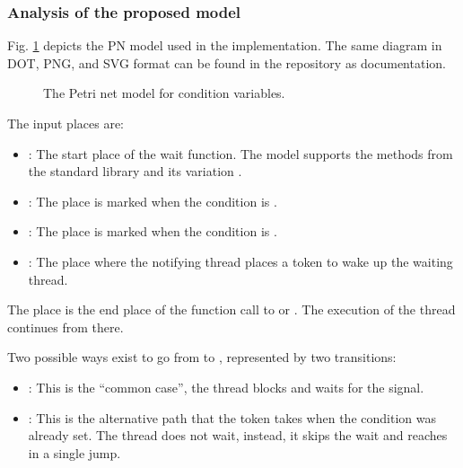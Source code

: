\subsubsection{Analysis of the proposed model}

Fig. \ref{fig:condition-variable-model} depicts
the \acrshort{PN} model used in the implementation.
The same diagram in DOT, PNG, and SVG format
can be found in the repository as documentation.

\begin{figure}[!htbp]
      \centering
      
      \caption{The Petri net model for condition variables.}
      \label{fig:condition-variable-model}
\end{figure}

The input places are:

\begin{itemize}
      \item {}: The start place of the wait function.
            The model supports the methods from the standard library 
            and its variation .
      \item {}: The place is marked when the condition is .
      \item {}: The place is marked when the condition is .
      \item {}: The place where the notifying thread places a token to wake up the waiting thread.
\end{itemize}

The  place is the end place
of the function call to  or .
The execution of the thread continues from there.

Two possible ways exist to go
from  to , represented by two transitions:

\begin{itemize}
      \item {}: This is the ``common case'', the thread blocks and waits for the signal.
      \item {}: This is the alternative path that the token takes when the condition was already set.
            The thread does not wait, instead, it skips the wait and reaches  in a single jump.
\end{itemize}

